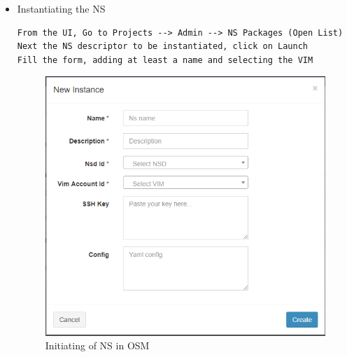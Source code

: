 \begin{itemize}
\item Instantiating the NS
\begin{lstlisting}
From the UI, Go to Projects --> Admin --> NS Packages (Open List)
Next the NS descriptor to be instantiated, click on Launch
Fill the form, adding at least a name and selecting the VIM
\end{lstlisting}
\begin{figure} [H]
	\centering
	\includegraphics[width=0.5\linewidth]{figures/sh5}
	\caption{Initiating of NS in OSM}
\end{figure}
\end{itemize}

